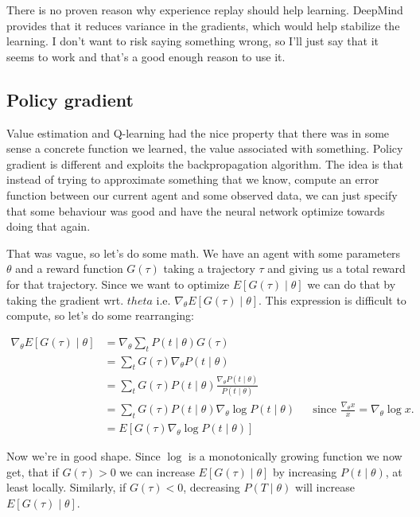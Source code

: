 \documentclass{article}
\theoremstyle{changedot}
\theoremstyle{changedotbreak}
\theoremstyle{nonumberplain}
\begin{document}
There is no proven reason why experience replay should help learning. DeepMind provides that it reduces variance in the gradients, which would help stabilize the learning. I don't want to risk saying something wrong, so I'll just say that it seems to work and that's a good enough reason to use it.

\subsection{Policy gradient}
Value estimation and Q-learning had the nice property that there was in some sense a concrete function we learned, the value associated with something. Policy gradient is different and exploits the backpropagation algorithm. The idea is that instead of trying to approximate something that we know, compute an error function between our current agent and some observed data, we can just specify that some behaviour was good and have the neural network optimize towards doing that again.

That was vague, so let's do some math. We have an agent with some parameters $\theta$ and a reward function $G(\tau)$ taking a trajectory $\tau$ and giving us a total reward for that trajectory. Since we want to optimize $E[G(\tau) \mid \theta]$ we can do that by taking the gradient wrt. $theta$ i.e. $\nabla_{\theta} E[G(\tau) \mid \theta]$. This expression is difficult to compute, so let's do some rearranging:

\begin{equation} \label{policy_grad}
\begin{aligned}
  \nabla_{\theta} E[G(\tau) \mid \theta] &= \nabla_{\theta} \sum_{t}P(t \mid \theta) G(\tau) \\
                                      &= \sum_{t} G(\tau) \nabla_{\theta} P(t \mid \theta)  \\
                                      &= \sum_{t} G(\tau) P(t \mid \theta) \frac{\nabla_{\theta} P(t \mid \theta)}{P(t \mid \theta)} \\
                                      &= \sum_{t} G(\tau) P(t \mid \theta) \nabla_{\theta} \log P(t \mid \theta) && \text{since $\frac{\nabla_{\theta} x}{x} = \nabla_{\theta} \log x$.} \\
                                      &= E[G(\tau) \nabla_{\theta} \log P(t \mid \theta)]
\end{aligned}
\end{equation}

Now we're in good shape. Since $\log$ is a monotonically growing function we now get, that if $G(\tau) > 0$ we can increase $E[G(\tau) \mid \theta]$ by increasing $P(t \mid \theta)$, at least locally. Similarly, if $G(\tau) < 0$, decreasing $P(T \mid \theta)$ will increase $E[G(\tau) \mid \theta]$.
\end{document}
